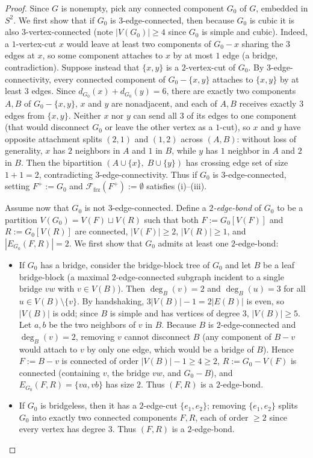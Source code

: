 \documentclass[11pt,reqno]{amsart}
\theoremstyle{plain}
\theoremstyle{definition}
\theoremstyle{remark}
\newcommand{\Ffrz}{\mathcal{F}_{\mathrm{frz}}}
\DeclareRobustCommand{\_}{\ifmmode\text{\textunderscore}\else\textunderscore\allowbreak\fi}
\begin{document}
\begin{proof}
Since $G$ is nonempty, pick any connected component $G_0$ of $G$, embedded in $S^2$. We first show that if $G_0$ is $3$-edge-connected, then because $G_0$ is cubic it is also $3$-vertex-connected (note $|V(G_0)| \ge 4$ since $G_0$ is simple and cubic). Indeed, a $1$-vertex-cut $x$ would leave at least two components of $G_0 - x$ sharing the $3$ edges at $x$, so some component attaches to $x$ by at most $1$ edge (a bridge, contradiction). Suppose instead that $\{x, y\}$ is a $2$-vertex-cut of $G_0$. By $3$-edge-connectivity, every connected component of $G_0 - \{x, y\}$ attaches to $\{x, y\}$ by at least $3$ edges. Since $d_{G_0}(x) + d_{G_0}(y) = 6$, there are exactly two components $A, B$ of $G_0 - \{x, y\}$, $x$ and $y$ are nonadjacent, and each of $A, B$ receives exactly $3$ edges from $\{x, y\}$. Neither $x$ nor $y$ can send all $3$ of its edges to one component (that would disconnect $G_0$ or leave the other vertex as a $1$-cut), so $x$ and $y$ have opposite attachment splits $(2, 1)$ and $(1, 2)$ across $(A, B)$: without loss of generality, $x$ has $2$ neighbors in $A$ and $1$ in $B$, while $y$ has $1$ neighbor in $A$ and $2$ in $B$. Then the bipartition $(A \cup \{x\},\; B \cup \{y\})$ has crossing edge set of size $1 + 1 = 2$, contradicting $3$-edge-connectivity. Thus if $G_0$ is $3$-edge-connected, setting $F^+ := G_0$ and $\Ffrz(F^+) := \emptyset$ satisfies (i)--(iii).

Assume now that $G_0$ is not $3$-edge-connected. Define a \emph{$2$-edge-bond} of $G_0$ to be a partition $V(G_0) = V(F) \sqcup V(R)$ such that both $F := G_0[V(F)]$ and $R := G_0[V(R)]$ are connected, $|V(F)| \ge 2$, $|V(R)| \ge 1$, and $|E_{G_0}(F, R)| = 2$. We first show that $G_0$ admits at least one $2$-edge-bond:
\begin{itemize}[leftmargin=1.8em]
  \item If $G_0$ has a bridge, consider the bridge-block tree of $G_0$ and let $B$ be a leaf bridge-block (a maximal $2$-edge-connected subgraph incident to a single bridge $vw$ with $v \in V(B)$). Then $\deg_B(v) = 2$ and $\deg_B(u) = 3$ for all $u \in V(B) \setminus \{v\}$. By handshaking, $3|V(B)| - 1 = 2|E(B)|$ is even, so $|V(B)|$ is odd; since $B$ is simple and has vertices of degree $3$, $|V(B)| \ge 5$. Let $a, b$ be the two neighbors of $v$ in $B$. Because $B$ is $2$-edge-connected and $\deg_B(v) = 2$, removing $v$ cannot disconnect $B$ (any component of $B - v$ would attach to $v$ by only one edge, which would be a bridge of $B$). Hence $F := B - v$ is connected of order $|V(B)| - 1 \ge 4 \ge 2$, $R := G_0 - V(F)$ is connected (containing $v$, the bridge $vw$, and $G_0 - B$), and $E_{G_0}(F, R) = \{va, vb\}$ has size $2$. Thus $(F, R)$ is a $2$-edge-bond.
  \item If $G_0$ is bridgeless, then it has a $2$-edge-cut $\{e_1, e_2\}$; removing $\{e_1, e_2\}$ splits $G_0$ into exactly two connected components $F, R$, each of order $\ge 2$ since every vertex has degree $3$. Thus $(F, R)$ is a $2$-edge-bond.
\end{itemize}


\end{proof}
\end{document}
